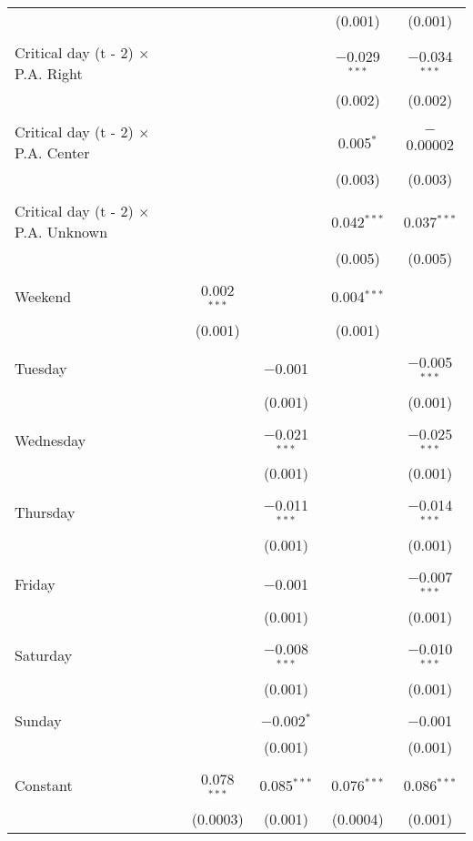 \documentclass[
]{article}
\begin{document}
\begin{table}[!htbp]
{\begin{tabular}{@{\extracolsep{5pt}}lcccc}
  &  &  & (0.001) & (0.001) \\ 
  & & & & \\ 
 Critical day (t - 2) $\times$ P.A. Right &  &  & $-$0.029$^{***}$ & $-$0.034$^{***}$ \\ 
  &  &  & (0.002) & (0.002) \\ 
  & & & & \\ 
 Critical day (t - 2) $\times$ P.A. Center &  &  & 0.005$^{*}$ & $-$0.00002 \\ 
  &  &  & (0.003) & (0.003) \\ 
  & & & & \\ 
 Critical day (t - 2) $\times$ P.A. Unknown &  &  & 0.042$^{***}$ & 0.037$^{***}$ \\ 
  &  &  & (0.005) & (0.005) \\ 
  & & & & \\ 
 Weekend & 0.002$^{***}$ &  & 0.004$^{***}$ &  \\ 
  & (0.001) &  & (0.001) &  \\ 
  & & & & \\ 
 Tuesday &  & $-$0.001 &  & $-$0.005$^{***}$ \\ 
  &  & (0.001) &  & (0.001) \\ 
  & & & & \\ 
 Wednesday &  & $-$0.021$^{***}$ &  & $-$0.025$^{***}$ \\ 
  &  & (0.001) &  & (0.001) \\ 
  & & & & \\ 
 Thursday &  & $-$0.011$^{***}$ &  & $-$0.014$^{***}$ \\ 
  &  & (0.001) &  & (0.001) \\ 
  & & & & \\ 
 Friday &  & $-$0.001 &  & $-$0.007$^{***}$ \\ 
  &  & (0.001) &  & (0.001) \\ 
  & & & & \\ 
 Saturday &  & $-$0.008$^{***}$ &  & $-$0.010$^{***}$ \\ 
  &  & (0.001) &  & (0.001) \\ 
  & & & & \\ 
 Sunday &  & $-$0.002$^{*}$ &  & $-$0.001 \\ 
  &  & (0.001) &  & (0.001) \\ 
  & & & & \\ 
 Constant & 0.078$^{***}$ & 0.085$^{***}$ & 0.076$^{***}$ & 0.086$^{***}$ \\ 
  & (0.0003) & (0.001) & (0.0004) & (0.001) \\ 

\end{tabular}}
\end{table}
\end{document}
